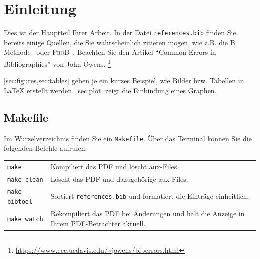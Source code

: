 %
%

\section{Einleitung}

Dies ist der Hauptteil Ihrer Arbeit.
In der Datei \texttt{references.bib} finden Sie bereits einige Quellen,
die Sie wahrscheinlich zitieren mögen,
wie z.B. die B Methode~\cite{abrial1996b,abrial2010modeling}
oder \textsc{ProB}~\cite{leuschel2003prob,leuschel2008prob}.
Beachten Sie den Artikel ``Common Errors in Bibliographies'' von John Owens.%
\footnote{\url{https://www.ece.ucdavis.edu/~jowens/biberrors.html}}

\cref{sec:figures,sec:tables}
geben je ein kurzes Beispiel,
wie Bilder bzw. Tabellen in \LaTeX{} erstellt werden.
\cref{sec:plot} zeigt die Einbindung eines Graphen.


\subsection{Makefile}

Im Wurzelverzeichnis finden Sie ein \texttt{Makefile}.
Über das Terminal können Sie die folgenden Befehle aufrufen:


\begin{tabularx}{\textwidth}{lX}
  \toprule
  \texttt{make} & Kompiliert das PDF und löscht aux-Files. \\
  \texttt{make clean} & Löscht das PDF und dazugehörige aux-Files. \\
  \texttt{make bibtool} & Sortiert \texttt{references.bib}
  und formatiert die Einträge einheitlich. \\
  \texttt{make watch} & Rekompiliert das PDF bei Änderungen und
  hält die Anzeige in Ihrem PDF-Betrachter aktuell. \\
  \bottomrule
\end{tabularx}

